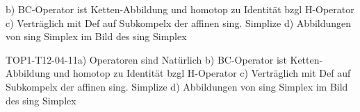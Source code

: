 b) BC-Operator ist Ketten-Abbildung und homotop zu Identität bzgl H-Operator 
c) Verträglich mit Def auf Subkompelx der affinen sing. Simplize
d) Abbildungen von sing Simplex im Bild des sing Simplex

\begin{THEO}{TOP1-T12-04-11}{a) Operatoren sind Natürlich 
b) BC-Operator ist Ketten-Abbildung und homotop zu Identität bzgl H-Operator 
c) Verträglich mit Def auf Subkompelx der affinen sing. Simplize
d) Abbildungen von sing Simplex im Bild des sing Simplex}
\end{THEO}
